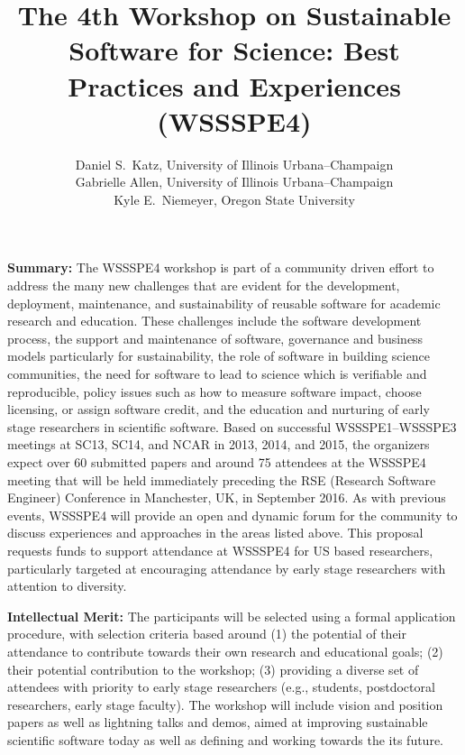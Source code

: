\documentclass[11pt]{article}
\title{\vspace{-2em}The 4th Workshop on Sustainable Software for Science: Best Practices and Experiences (WSSSPE4)
}
\author{Daniel S.\ Katz, University of Illinois Urbana--Champaign \\
        Gabrielle Allen, University of Illinois Urbana--Champaign \\
	Kyle E.\ Niemeyer, Oregon State University
	}
\date{}                                           %
\begin{document}
\maketitle


\noindent \textbf{Summary:} The WSSSPE4 workshop is part of a community driven effort to address the many new challenges that are evident for the development, deployment, maintenance, and sustainability of reusable software for academic research and education. These challenges include the software development process, the support and maintenance of software, governance and business models particularly for sustainability, the role of software in building science communities, the need for software to lead to science which is verifiable and reproducible, policy issues such as how to measure software impact, choose licensing, or assign software credit, and the education and nurturing of early stage researchers in scientific software. 
Based on successful WSSSPE1--WSSSPE3 meetings at SC13, SC14, and NCAR in 2013, 2014, and 2015, the organizers expect over 60 submitted papers and around 75 attendees at the WSSSPE4 meeting that will be held immediately preceding the RSE (Research Software Engineer) Conference in Manchester, UK, in September 2016.  As with previous events, WSSSPE4 will provide an open and dynamic forum for the community to discuss experiences and approaches in the areas listed above. This proposal requests funds to support attendance at WSSSPE4 for US based researchers, particularly targeted at encouraging attendance by early stage researchers with attention to diversity. 

\noindent \textbf{Intellectual Merit:} The participants will be selected using a formal application procedure, with selection criteria based around (1) the potential of their attendance to contribute towards their own research and educational goals; (2) their potential contribution to the workshop; (3) providing a diverse set of attendees with priority to early stage researchers (e.g., students, postdoctoral researchers, early stage faculty). The workshop will include vision and position papers as well as lightning talks and demos, aimed at improving sustainable scientific software today as well as defining and working towards the its future. 
\end{document}
